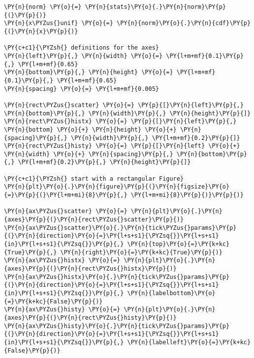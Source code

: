     \begin{tcolorbox}[breakable, size=fbox, boxrule=1pt, pad at break*=1mm,colback=cellbackground, colframe=cellborder]
\begin{Verbatim}[commandchars=\\\{\}]
\PY{n}{norm} \PY{o}{=} \PY{n}{stats}\PY{o}{.}\PY{n}{norm}\PY{p}{(}\PY{p}{)}
\PY{n}{x\PYZus{}unif} \PY{o}{=} \PY{n}{norm}\PY{o}{.}\PY{n}{cdf}\PY{p}{(}\PY{n}{x}\PY{p}{)}

\PY{c+c1}{\PYZsh{} definitions for the axes}
\PY{n}{left}\PY{p}{,} \PY{n}{width} \PY{o}{=} \PY{l+m+mf}{0.1}\PY{p}{,} \PY{l+m+mf}{0.65}
\PY{n}{bottom}\PY{p}{,} \PY{n}{height} \PY{o}{=} \PY{l+m+mf}{0.1}\PY{p}{,} \PY{l+m+mf}{0.65}
\PY{n}{spacing} \PY{o}{=} \PY{l+m+mf}{0.005}

\PY{n}{rect\PYZus{}scatter} \PY{o}{=} \PY{p}{[}\PY{n}{left}\PY{p}{,} \PY{n}{bottom}\PY{p}{,} \PY{n}{width}\PY{p}{,} \PY{n}{height}\PY{p}{]}
\PY{n}{rect\PYZus{}histx} \PY{o}{=} \PY{p}{[}\PY{n}{left}\PY{p}{,} \PY{n}{bottom} \PY{o}{+} \PY{n}{height} \PY{o}{+} \PY{n}{spacing}\PY{p}{,} \PY{n}{width}\PY{p}{,} \PY{l+m+mf}{0.2}\PY{p}{]}
\PY{n}{rect\PYZus{}histy} \PY{o}{=} \PY{p}{[}\PY{n}{left} \PY{o}{+} \PY{n}{width} \PY{o}{+} \PY{n}{spacing}\PY{p}{,} \PY{n}{bottom}\PY{p}{,} \PY{l+m+mf}{0.2}\PY{p}{,} \PY{n}{height}\PY{p}{]}

\PY{c+c1}{\PYZsh{} start with a rectangular Figure}
\PY{n}{plt}\PY{o}{.}\PY{n}{figure}\PY{p}{(}\PY{n}{figsize}\PY{o}{=}\PY{p}{(}\PY{l+m+mi}{8}\PY{p}{,} \PY{l+m+mi}{8}\PY{p}{)}\PY{p}{)}

\PY{n}{ax\PYZus{}scatter} \PY{o}{=} \PY{n}{plt}\PY{o}{.}\PY{n}{axes}\PY{p}{(}\PY{n}{rect\PYZus{}scatter}\PY{p}{)}
\PY{n}{ax\PYZus{}scatter}\PY{o}{.}\PY{n}{tick\PYZus{}params}\PY{p}{(}\PY{n}{direction}\PY{o}{=}\PY{l+s+s1}{\PYZsq{}}\PY{l+s+s1}{in}\PY{l+s+s1}{\PYZsq{}}\PY{p}{,} \PY{n}{top}\PY{o}{=}\PY{k+kc}{True}\PY{p}{,} \PY{n}{right}\PY{o}{=}\PY{k+kc}{True}\PY{p}{)}
\PY{n}{ax\PYZus{}histx} \PY{o}{=} \PY{n}{plt}\PY{o}{.}\PY{n}{axes}\PY{p}{(}\PY{n}{rect\PYZus{}histx}\PY{p}{)}
\PY{n}{ax\PYZus{}histx}\PY{o}{.}\PY{n}{tick\PYZus{}params}\PY{p}{(}\PY{n}{direction}\PY{o}{=}\PY{l+s+s1}{\PYZsq{}}\PY{l+s+s1}{in}\PY{l+s+s1}{\PYZsq{}}\PY{p}{,} \PY{n}{labelbottom}\PY{o}{=}\PY{k+kc}{False}\PY{p}{)}
\PY{n}{ax\PYZus{}histy} \PY{o}{=} \PY{n}{plt}\PY{o}{.}\PY{n}{axes}\PY{p}{(}\PY{n}{rect\PYZus{}histy}\PY{p}{)}
\PY{n}{ax\PYZus{}histy}\PY{o}{.}\PY{n}{tick\PYZus{}params}\PY{p}{(}\PY{n}{direction}\PY{o}{=}\PY{l+s+s1}{\PYZsq{}}\PY{l+s+s1}{in}\PY{l+s+s1}{\PYZsq{}}\PY{p}{,} \PY{n}{labelleft}\PY{o}{=}\PY{k+kc}{False}\PY{p}{)}


\end{Verbatim}
\end{tcolorbox}
